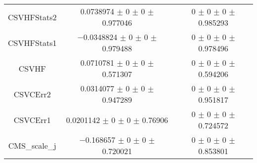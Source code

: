 \begin{table}
\begin{tabular}{ccc}
CSVHFStats2 	& \num{0.0738974} $\pm$ \num{0} $\pm$ \num{0} $\pm$ \num{0.977046} 	& \num{0} $\pm$ \num{0} $\pm$ \num{0} $\pm$ \num{0.985293}\\
CSVHFStats1 	& \num{-0.0348824} $\pm$ \num{0} $\pm$ \num{0} $\pm$ \num{0.979488} 	& \num{0} $\pm$ \num{0} $\pm$ \num{0} $\pm$ \num{0.978496}\\
CSVHF 	& \num{0.0710781} $\pm$ \num{0} $\pm$ \num{0} $\pm$ \num{0.571307} 	& \num{0} $\pm$ \num{0} $\pm$ \num{0} $\pm$ \num{0.594206}\\
CSVCErr2 	& \num{0.0314077} $\pm$ \num{0} $\pm$ \num{0} $\pm$ \num{0.947289} 	& \num{0} $\pm$ \num{0} $\pm$ \num{0} $\pm$ \num{0.951817}\\
CSVCErr1 	& \num{0.0201142} $\pm$ \num{0} $\pm$ \num{0} $\pm$ \num{0.76906} 	& \num{0} $\pm$ \num{0} $\pm$ \num{0} $\pm$ \num{0.724572}\\
CMS\_scale\_j 	& \num{-0.168657} $\pm$ \num{0} $\pm$ \num{0} $\pm$ \num{0.720021} 	& \num{0} $\pm$ \num{0} $\pm$ \num{0} $\pm$ \num{0.853801}\\
\bottomrule
\end{tabular}
\end{table}